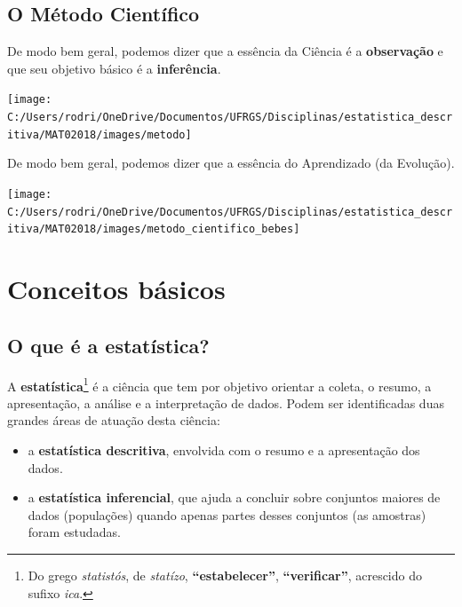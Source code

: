 \documentclass[]{tufte-book}
\providecommand{\tightlist}{%
  \setlength{\itemsep}{0pt}\setlength{\parskip}{0pt}}
\begin{document}
\hypertarget{o-muxe9todo-cientuxedfico}{%
\section{O Método Científico}\label{o-muxe9todo-cientuxedfico}}

De modo bem geral, podemos dizer que a essência da Ciência é a
\textbf{observação} e que seu objetivo básico é a \textbf{inferência}.

\begin{center}\texttt{[image: C:/Users/rodri/OneDrive/Documentos/UFRGS/Disciplinas/estatistica\_descritiva/MAT02018/images/metodo]} \end{center}

De modo bem geral, podemos dizer que a essência do Aprendizado (da
Evolução).

\begin{center}\texttt{[image: C:/Users/rodri/OneDrive/Documentos/UFRGS/Disciplinas/estatistica\_descritiva/MAT02018/images/metodo\_cientifico\_bebes]} \end{center}

\hypertarget{conceitos-buxe1sicos}{%
\chapter{Conceitos básicos}\label{conceitos-buxe1sicos}}

\hypertarget{o-que-uxe9-a-estatuxedstica}{%
\section{O que é a estatística?}\label{o-que-uxe9-a-estatuxedstica}}

A \textbf{estatística}\footnote{Do grego \emph{statistós}, de
  \emph{statízo}, \textbf{``estabelecer''}, \textbf{``verificar''},
  acrescido do sufixo \emph{ica}.} é a ciência que tem por objetivo
orientar a coleta, o resumo, a apresentação, a análise e a interpretação
de dados. Podem ser identificadas duas grandes áreas de atuação desta
ciência:

\begin{itemize}
\tightlist
\item
  a \textbf{estatística descritiva}, envolvida com o resumo e a
  apresentação dos dados.
\item
  a \textbf{estatística inferencial}, que ajuda a concluir sobre
  conjuntos maiores de dados (populações) quando apenas partes desses
  conjuntos (as amostras) foram estudadas. 
\end{itemize}
\end{document}
